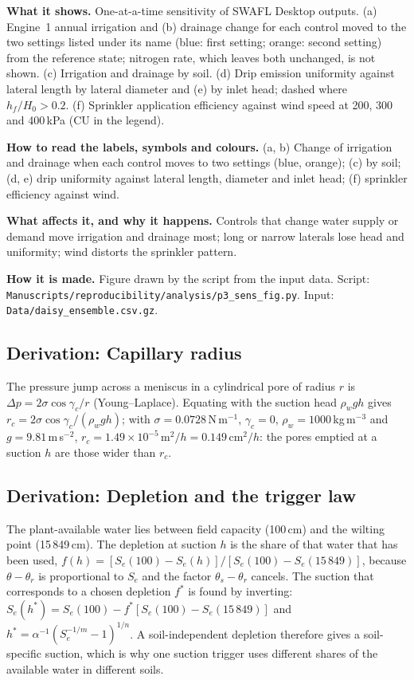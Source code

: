 \textbf{What it shows.} One-at-a-time sensitivity of SWAFL Desktop outputs. (a) Engine~1 annual irrigation and (b) drainage change for each control moved to the two settings listed under its name (blue: first setting; orange: second setting) from the reference state; nitrogen rate, which leaves both unchanged, is not shown. (c) Irrigation and drainage by soil. (d) Drip emission uniformity against lateral length by lateral diameter and (e) by inlet head; dashed where $h_f/H_0>0.2$. (f) Sprinkler application efficiency against wind speed at 200, 300 and 400\,kPa (CU in the legend).

\textbf{How to read the labels, symbols and colours.} (a, b) Change of irrigation and drainage when each control moves to two settings (blue, orange); (c) by soil; (d, e) drip uniformity against lateral length, diameter and inlet head; (f) sprinkler efficiency against wind.

\textbf{What affects it, and why it happens.} Controls that change water supply or demand move irrigation and drainage most; long or narrow laterals lose head and uniformity; wind distorts the sprinkler pattern.

\textbf{How it is made.} Figure drawn by the script from the input data. Script: \nolinkurl{Manuscripts/reproducibility/analysis/p3_sens_fig.py}. Input: \nolinkurl{Data/daisy_ensemble.csv.gz}.


\subsection{Derivation: Capillary radius}\label{der:s2:2}
The pressure jump across a meniscus in a cylindrical pore of radius $r$ is $\Delta p=2\sigma\cos\gamma_c/r$ (Young--Laplace). Equating with the suction head $\rho_wgh$ gives $r_c=2\sigma\cos\gamma_c/(\rho_wgh)$; with $\sigma=0.0728$\,N\,m$^{-1}$, $\gamma_c=0$, $\rho_w=1000$\,kg\,m$^{-3}$ and $g=9.81$\,m\,s$^{-2}$, $r_c=1.49\times10^{-5}\,\mathrm{m^2}/h=0.149\,\mathrm{cm^2}/h$: the pores emptied at a suction $h$ are those wider than $r_c$.


\subsection{Derivation: Depletion and the trigger law}\label{der:s2:3}
The plant-available water lies between field capacity (100\,cm) and the wilting point (15\,849\,cm). The depletion at suction $h$ is the share of that water that has been used, $f(h)=[S_e(100)-S_e(h)]/[S_e(100)-S_e(15\,849)]$, because $\theta-\theta_r$ is proportional to $S_e$ and the factor $\theta_s-\theta_r$ cancels. The suction that corresponds to a chosen depletion $f^\ast$ is found by inverting: $S_e(h^\ast)=S_e(100)-f^\ast[S_e(100)-S_e(15\,849)]$ and $h^\ast=\alpha^{-1}(S_e^{-1/m}-1)^{1/n}$. A soil-independent depletion therefore gives a soil-specific suction, which is why one suction trigger uses different shares of the available water in different soils.


